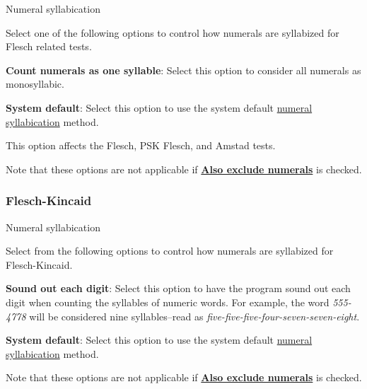 \documentclass[
]{book}
\newenvironment{optionssection}
    {
    \begin{tcolorbox}[colframe=lightgray,colback=ultralightgray,sharp corners=all,parbox=false]
    }
    {
    \end{tcolorbox}
    }
\newenvironment{optionssectiontitle}
    {
    \begin{tcolorbox}[colframe=lightgray,colback=lightgray]
    \bfseries
    }
    {
    \end{tcolorbox}
    }
\theoremstyle{definition}
\theoremstyle{definition}
\theoremstyle{definition}
\theoremstyle{definition}
\theoremstyle{remark}
\begin{document}
\begin{optionssection}

\begin{optionssectiontitle}
Numeral syllabication

\end{optionssectiontitle}

Select one of the following options to control how numerals are syllabized for Flesch related tests.

\textbf{Count numerals as one syllable}: Select this option to consider all numerals as monosyllabic.

\textbf{System default}: Select this option to use the system default \protect\hyperlink{numsyllable}{numeral syllabication} method.

This option affects the Flesch, PSK Flesch, and Amstad tests.

Note that these options are not applicable if \protect\hyperlink{options-text-exclusion}{\textbf{Also exclude numerals}} is checked.

\end{optionssection}

\hypertarget{options-flesch-kincaid}{%
\subsubsection*{Flesch-Kincaid}\label{options-flesch-kincaid}}

\begin{optionssection}

\begin{optionssectiontitle}
Numeral syllabication

\end{optionssectiontitle}

Select from the following options to control how numerals are syllabized for Flesch-Kincaid.

\textbf{Sound out each digit}: Select this option to have the program sound out each digit when counting the syllables of numeric words. For example, the word \emph{555-4778} will be considered nine syllables--read as \emph{five-five-five-four-seven-seven-eight}.

\textbf{System default}: Select this option to use the system default \protect\hyperlink{numsyllable}{numeral syllabication} method.

Note that these options are not applicable if \protect\hyperlink{options-text-exclusion}{\textbf{Also exclude numerals}} is checked.

\end{optionssection}
\end{document}
